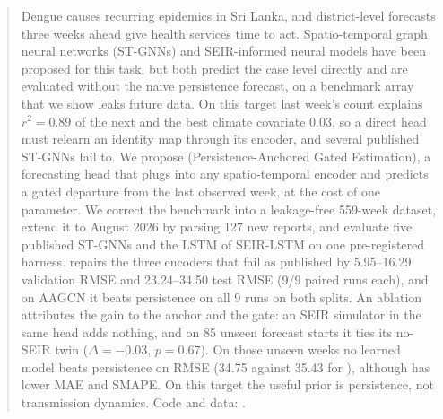 \begin{abstract}
Dengue causes recurring epidemics in Sri Lanka, and district-level forecasts three
weeks ahead give health services time to act. Spatio-temporal graph neural networks
(ST-GNNs) and SEIR-informed neural models have been proposed for this task, but both
predict the case level directly and are evaluated without the naive persistence
forecast, on a benchmark array that we show leaks future data. On this target last
week's count explains $r^2=0.89$ of the next and the best climate covariate $0.03$,
so a direct head must relearn an identity map through its encoder, and several
published ST-GNNs fail to. We propose \model{} (Persistence-Anchored Gated
Estimation), a forecasting head that plugs into any spatio-temporal encoder and
predicts a gated departure from the last observed week, at the cost of one
parameter. We correct the benchmark into a leakage-free 559-week dataset,
extend it to August 2026 by parsing 127 new reports, and evaluate five published ST-GNNs and the LSTM of
SEIR-LSTM on one pre-registered harness. \model{} repairs the three encoders that
fail as published by 5.95--16.29 validation RMSE and 23.24--34.50 test RMSE (9/9
paired runs each), and on AAGCN it beats persistence on all 9 runs on both splits. An
ablation attributes the gain to the anchor and the gate: an SEIR simulator in the
same head adds nothing, and on 85 unseen forecast starts it ties its no-SEIR twin
($\Delta=-0.03$, $p=0.67$). On those unseen weeks no learned model beats persistence
on RMSE (34.75 against 35.43 for \model{}), although \model{} has lower MAE and
SMAPE. On this target the useful prior is persistence, not transmission dynamics.
Code and data: \codeurl.
\end{abstract}

